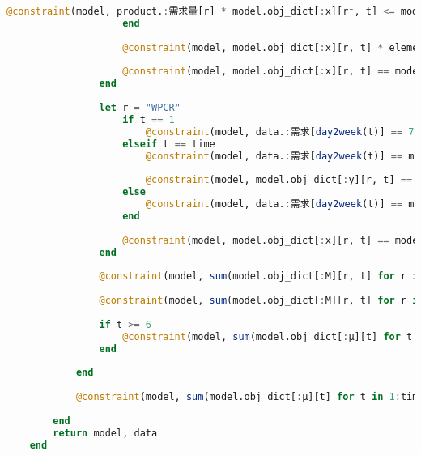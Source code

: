 \begin{appendices}
\begin{lstlisting}[language=julia]
                        @constraint(model, product.:需求量[r] * model.obj_dict[:x][r⁻, t] <= model.obj_dict[:y][r, t-1])
                    end
    
                    @constraint(model, model.obj_dict[:x][r, t] * element[r].:工时消耗 == model.obj_dict[:M][r, t] * model.obj_dict[:ω][r, t])
    
                    @constraint(model, model.obj_dict[:x][r, t] == model.obj_dict[:x][r, t] * model.obj_dict[:ω][r, t])
                end
    
                let r = "WPCR"
                    if t == 1
                        @constraint(model, data.:需求[day2week(t)] == 75 + model.obj_dict[:x][r, t] - model.obj_dict[:y][r, t])
                    elseif t == time
                        @constraint(model, data.:需求[day2week(t)] == model.obj_dict[:y][r, t-1] + model.obj_dict[:x][r, t] - model.obj_dict[:y][r, t])
    
                        @constraint(model, model.obj_dict[:y][r, t] == 0)
                    else
                        @constraint(model, data.:需求[day2week(t)] == model.obj_dict[:y][r, t-1] + model.obj_dict[:x][r, t] - model.obj_dict[:y][r, t])
                    end
    
                    @constraint(model, model.obj_dict[:x][r, t] == model.obj_dict[:x][r, t] * model.obj_dict[:ω][r, t])
                end
    
                @constraint(model, sum(model.obj_dict[:M][r, t] for r in element_key) <= data.:生产总工时限制[int2week(t)] * (1 - model.obj_dict[:μ][t] + 0.1 * model.obj_dict[:μ][t-1] + 0.08 * model.obj_dict[:μ][t-2] + 0.06 * model.obj_dict[:μ][t-3] + 0.04 * model.obj_dict[:μ][t-4] + 0.02 * model.obj_dict[:μ][t-5]))
    
                @constraint(model, sum(model.obj_dict[:M][r, t] for r in element_key) <= data.:生产总工时限制[int2week(t)])
    
                if t >= 6
                    @constraint(model, sum(model.obj_dict[:μ][t] for t in t-5:t) <= 1)
                end
    
            end
    
            @constraint(model, sum(model.obj_dict[:μ][t] for t in 1:time) == 7)
    
        end
        return model, data
    end
    

\end{lstlisting}
\end{appendices}
